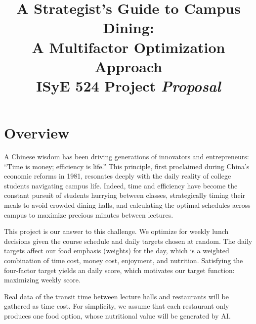 \documentclass{article}
\title{ 
  \textbf{A Strategist's Guide to Campus Dining:} \\
  \Large A Multifactor Optimization Approach \\
  \vspace{0.5em}
  \normalsize ISyE 524 Project \textit{Proposal}
}
\begin{document}
\maketitle\begin{center}
\end{center}



\section{Overview}

A Chinese wisdom has been driving generations of innovators and entrepreneurs: ``Time is money; efficiency is life.'' This principle, first proclaimed during China's economic reforms in 1981, resonates deeply with the daily reality of college students navigating campus life. Indeed, time and efficiency have become the constant pursuit of students hurrying between classes, strategically timing their meals to avoid crowded dining halls, and calculating the optimal schedules across campus to maximize precious minutes between lectures.

This project is our answer to this challenge. We optimize for weekly lunch decisions given the course schedule and daily targets chosen at random. The daily targets affect our food emphasis (weights) for the day, which is a weighted combination of time cost, money cost, enjoyment, and nutrition. Satisfying the four-factor target yields an daily score, which motivates our target function: maximizing weekly score.


Real data of the transit time between lecture halls and restaurants will be gathered as time cost. For simplicity, we assume that each restaurant only produces one food option, whose nutritional value will be generated by AI.
\end{document}
